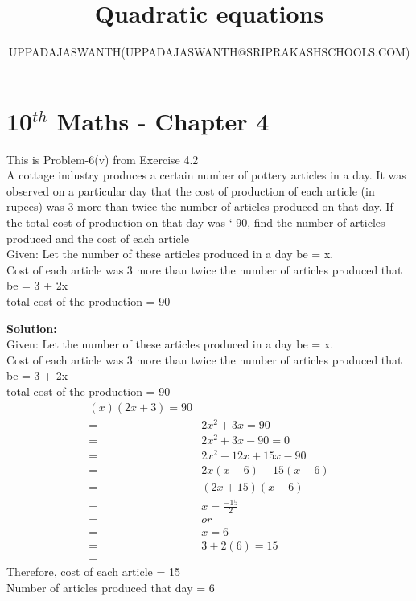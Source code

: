 \documentclass[12pt]{article}
\title{Quadratic equations}
\author{UPPADAJASWANTH(UPPADAJASWANTH@SRIPRAKASHSCHOOLS.COM)}
\newcommand{\solution}{\noindent \textbf{Solution: }}
\begin{document}
\section*{10$^{th}$ Maths - Chapter 4}
This is Problem-6(v) from Exercise 4.2\\
A cottage industry produces a certain number of pottery articles in a day. It was observed
on a particular day that the cost of production of each article (in rupees) was 3 more than
twice the number of articles produced on that day. If the total cost of production on that
day was ` 90, find the number of articles produced and the cost of each article\\
Given:
Let the number of these articles produced in a day be = x.\\
Cost of each article was 3 more than twice the number of articles
produced that be = 3 + 2x\\
total cost of the production = 90

\solution\\
Given:
Let the number of these articles produced in a day be = x.\\
Cost of each article was 3 more than twice the number of articles
produced that be = 3 + 2x\\
total cost of the production = 90\\
\begin{align}
{(x)(2x + 3) = 90}\\=&
{2x^2+3x=90}\\=&
{2x^2+3x-90=0}\\=&
{2x^2-12x+15x-90}\\=&
{2x(x-6)+15(x-6)}\\=&
{(2x+15)(x-6)}\\=&
{x=\frac{-15}{2}}\\=&
or\\=&
{x=6}\\=&
{3+2(6)=15}\\=&
\end{align}
Therefore, cost of each article = 15\\
Number of articles produced that day = 6\\
\end{document}
